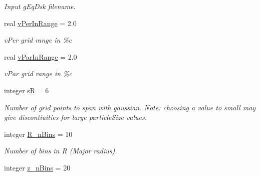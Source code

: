 \begin{CompactItemize}
\begin{CompactList}\small\item\em Input gEqDsk filename. \item\end{CompactList}\item 
\hypertarget{namespaceread__namelist_c6eb7f3fd517c3e45d4611790a20ab62}{
real \hyperlink{namespaceread__namelist_c6eb7f3fd517c3e45d4611790a20ab62}{vPerInRange} = 2.0}
\label{namespaceread__namelist_c6eb7f3fd517c3e45d4611790a20ab62}

\begin{CompactList}\small\item\em vPer grid range in \%c \item\end{CompactList}\item 
\hypertarget{namespaceread__namelist_b4f33b7bb7e8451ee4d78035bc61a30a}{
real \hyperlink{namespaceread__namelist_b4f33b7bb7e8451ee4d78035bc61a30a}{vParInRange} = 2.0}
\label{namespaceread__namelist_b4f33b7bb7e8451ee4d78035bc61a30a}

\begin{CompactList}\small\item\em vPar grid range in \%c \item\end{CompactList}\item 
\hypertarget{namespaceread__namelist_33cc65d585813b00097fe76d32b80df8}{
integer \hyperlink{namespaceread__namelist_33cc65d585813b00097fe76d32b80df8}{sR} = 6}
\label{namespaceread__namelist_33cc65d585813b00097fe76d32b80df8}

\begin{CompactList}\small\item\em Number of grid points to span with gaussian. Note: choosing a value to small may give discontiuities for large particleSize values. \item\end{CompactList}\item 
\hypertarget{namespaceread__namelist_24c9a9421067413f4e93c64af895b5c0}{
integer \hyperlink{namespaceread__namelist_24c9a9421067413f4e93c64af895b5c0}{R\_\-nBins} = 10}
\label{namespaceread__namelist_24c9a9421067413f4e93c64af895b5c0}

\begin{CompactList}\small\item\em Number of bins in R (Major radius). \item\end{CompactList}\item 
\hypertarget{namespaceread__namelist_6b9bbaddd44e50bea5095f432add377f}{
integer \hyperlink{namespaceread__namelist_6b9bbaddd44e50bea5095f432add377f}{z\_\-nBins} = 20}
\label{namespaceread__namelist_6b9bbaddd44e50bea5095f432add377f}


\end{CompactItemize}
